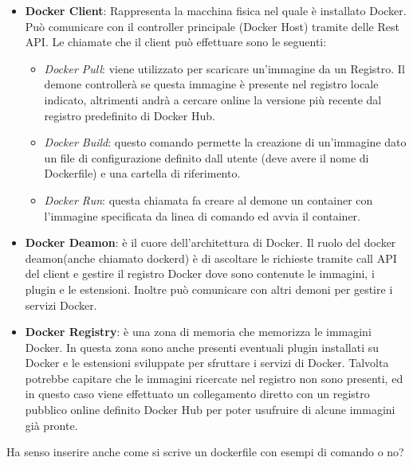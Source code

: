 \begin{itemize}
    \item \textbf{Docker Client}: Rappresenta la macchina fisica nel quale è installato Docker. Può comunicare con il controller principale (Docker Host) tramite delle Rest API.
    Le chiamate che il client può effettuare sono le seguenti:
        \begin{itemize}
            \item \textit{Docker Pull}: viene utilizzato per scaricare un'immagine da un Registro. Il demone controllerà se questa immagine è presente nel registro locale indicato, altrimenti andrà a cercare online
                la versione più recente dal registro predefinito di Docker Hub.
            \item \textit{Docker Build}: questo comando permette la creazione di un'immagine dato un file di configurazione definito dall utente (deve avere il nome di Dockerfile) e una cartella di riferimento.
            \item \textit{Docker Run}: questa chiamata fa creare al demone un container con l'immagine specificata da linea di comando ed avvia il container.
        \end{itemize}
    \item \textbf{Docker Deamon}: è il cuore dell'architettura di Docker. Il ruolo del docker deamon(anche chiamato dockerd) è di ascoltare le richieste tramite call API del client e gestire il registro Docker dove sono contenute
        le immagini, i plugin e le estensioni. Inoltre può comunicare con altri demoni per gestire i servizi Docker.
    \item \textbf{Docker Registry}: è  una zona di memoria che memorizza le immagini Docker. In questa zona sono anche presenti eventuali plugin installati su Docker e le estensioni sviluppate per sfruttare i servizi di Docker.
        Talvolta potrebbe capitare che le immagini ricercate nel registro non sono presenti, ed in questo caso viene effettuato un collegamento diretto con un registro pubblico online definito Docker Hub per poter usufruire di alcune
        immagini già pronte.
\end{itemize}


Ha senso inserire anche come si scrive un dockerfile con esempi di comando o no?

